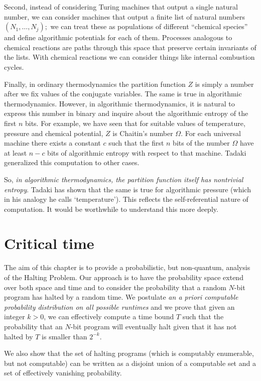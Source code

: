 \documentclass[12pt,twoside,openright]{report}
\begin{document}
Second, instead of considering Turing machines that output a single natural number, we can consider machines that output a finite list of natural numbers $(N_1, \ldots, N_j);$ we can treat these as populations of different ``chemical species'' and define algorithmic potentials for each of them.  Processes analogous to chemical reactions are paths through this space that preserve certain invariants of the lists.  With chemical reactions we can consider things like internal combustion cycles.

Finally, in ordinary thermodynamics the partition function $Z$ is simply a number after we fix values of the conjugate variables.  The same is true in algorithmic thermodynamics.  However, in algorithmic thermodynamics, it is natural to express this number in binary and inquire about the algorithmic entropy of the first $n$ bits.  For example, we have seen that for suitable values of temperature, pressure and chemical potential, $Z$ is Chaitin's number $\Omega$. For each universal machine there exists a constant $c$ such that the first $n$ bits of the number $\Omega$ have at least 
$n - c$ bits of algorithmic entropy with respect to that machine.  Tadaki \cite{Tadaki2002} generalized this computation to other cases.

So, \textit{in algorithmic thermodynamics, the partition function itself has nontrivial entropy}.  Tadaki has shown that the same is true for algorithmic pressure (which in his analogy he calls `temperature').   This reflects the self-referential nature of computation.  It would be worthwhile to understand this more deeply.
  

\chapter{Critical time}

The aim of this chapter is to provide a probabilistic, but non-quantum, analysis of the Halting Problem.  Our approach is to have the probability space extend over both space and time and to consider the probability that a random $N$-bit program has halted by a random time. We postulate {\it an a priori computable probability distribution on all possible runtimes} and we prove that given an integer $k>0$, we can effectively compute a time bound $T$ such that the probability that an $N$-bit program will eventually halt given that it has not halted by $T$ is smaller than $2^{-k}$.  

We also show that the set of halting programs (which is computably enumerable, but not computable) can be written as a disjoint union of a computable set and a set of effectively vanishing probability.
\end{document}
